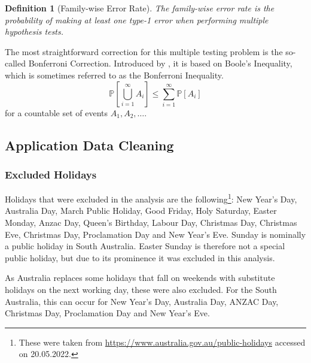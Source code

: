 \documentclass[12pt, a4paper]{article}
\theoremstyle{MAstyle} \newtheorem{assumption}{Assumption}[section]
\theoremstyle{MAstyle} \newtheorem{definition}{Definition}[section]
\theoremstyle{MAstyle} \newtheorem{theorem}{Theorem}[section]
\begin{document}
			\begin{definition}[Family-wise Error Rate]
				The family-wise error rate is the probability of making at least one type-1 error when performing multiple hypothesis tests.
			\end{definition}
		
				The most straightforward correction for this multiple testing problem is the so-called Bonferroni Correction. Introduced by \cite{dunn_multiple_1961}, it is based on Boole's Inequality, which is sometimes referred to as the Bonferroni Inequality.
				\begin{equation}
						\mathbb{P}\left[\bigcup_{i = 1}^{\infty} A_i\right] \leq \sum_{i = 1}^{\infty} \mathbb{P}\left[A_i\right]
					\end{equation}
				for a countable set of events $A_1, A_2, \dots$.
		

			
		\subsection{Application Data Cleaning}\label{Application_Appendix}
			\subsubsection{Excluded Holidays}
			Holidays that were excluded in the analysis are the following\footnote{These were taken from \url{https://www.australia.gov.au/public-holidays} accessed on 20.05.2022.}: New Year's Day, Australia Day, March Public Holiday, Good Friday, Holy Saturday, Easter Monday, Anzac Day, Queen's Birthday, Labour Day, Christmas Day, Christmas Eve, Christmas Day, Proclamation Day and New Year's Eve. Sunday is nominally a public holiday in South Australia. Easter Sunday is therefore not a special public holiday, but due to its prominence it was excluded in this analysis.
			
			As Australia replaces some holidays that fall on weekends with substitute holidays on the next working day, these were also excluded. For the South Australia, this can occur for New Year's Day, Australia Day, ANZAC Day, Christmas Day, Proclamation Day and New Year's Eve.
		
\end{document}
